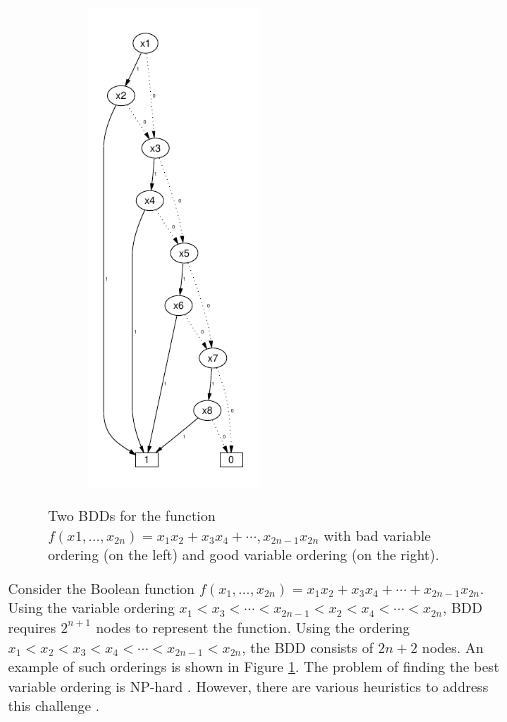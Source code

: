 \documentclass[pdflatex,sn-mathphys-num]{sn-jnl}%
\theoremstyle{thmstyleone}%
\theoremstyle{thmstyletwo}%
\theoremstyle{thmstylethree}%
\begin{document}
\begin{figure}[h]
\begin{subfigure}{0.3\textwidth}
                \includegraphics[width=0.5\textwidth]{Figures/BDD_Variable_Ordering_Good.pdf}
            \end{subfigure}
            \caption{Two BDDs for the function $f(x1,\dots, x_{2n}) = x_1x_2 + x_3x_4 + \cdots, x_{2n-1}x_{2n}$ with bad variable ordering (on the left) and good variable ordering (on the right).}
            \label{figure::ordering}
        \end{figure}

        Consider the Boolean function $f(x_1, \dots, x_{2n}) = x_1x_2 + x_3x_4 + \cdots + x_{2n-1}x_{2n}$. Using the variable ordering $x_1 < x_3 < \cdots < x_{2n-1} < x_2 < x_4 < \cdots < x_{2n}$, BDD requires $2^{n+1}$ nodes to represent the function. Using the ordering $x_1 < x_2 < x_3 < x_4 < \cdots < x_{2n-1} < x_{2n}$, the BDD consists of $2n + 2$ nodes. An example of such orderings is shown in Figure \ref{figure::ordering}. The problem of finding the best variable ordering is NP-hard \cite{BDD_np-hard}. However, there are various heuristics to address this challenge \cite{BDD_heuristics}.
\end{document}
